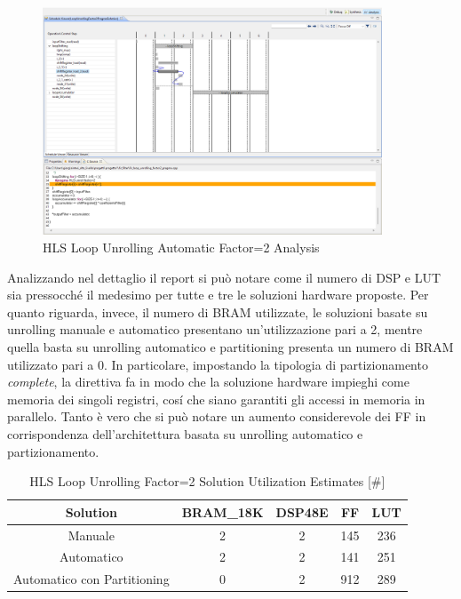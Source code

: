 \begin{figure}[H]
    \centering
    \includegraphics[width=0.9\textwidth]{solutions/loop_unrolling/factor2/loopunrollingautomatic2.png}
    \caption{HLS Loop Unrolling Automatic Factor=2 Analysis}
\end{figure}

Analizzando nel dettaglio il report si può notare come il numero di DSP e LUT sia pressocché il medesimo per tutte e tre le soluzioni hardware proposte. Per quanto riguarda, invece, il numero di BRAM utilizzate, le soluzioni basate su unrolling manuale e automatico presentano un'utilizzazione pari a 2, mentre quella basta su unrolling automatico e partitioning presenta un numero di BRAM utilizzato pari a 0. In particolare, impostando la tipologia di partizionamento \textit{complete}, la direttiva fa in modo che la soluzione hardware impieghi come memoria dei singoli registri, cosí che siano garantiti gli accessi in memoria in parallelo. Tanto è vero che si può notare un aumento considerevole dei FF in corrispondenza dell'architettura basata su unrolling automatico e partizionamento.

\begin{table}[H]
    \centering
    \begin{tabular}{|c|c|c|c|c|}
        \hline
        \textbf{Solution} & \textbf{BRAM\_18K} & \textbf{DSP48E} & \textbf{FF} & \textbf{LUT} \\
        \hline
        Manuale & 2 & 2 & 145 & 236 \\
        \hline
        Automatico & 2 & 2 & 141 & 251 \\
        \hline
        Automatico con Partitioning & 0 & 2 & 912 & 289 \\
        \hline
    \end{tabular}
    \caption{HLS Loop Unrolling Factor=2 Solution Utilization Estimates [\#]}
    \label{tab:hls-loop-unrolling-factor2-solution-utilization-report}
\end{table}

